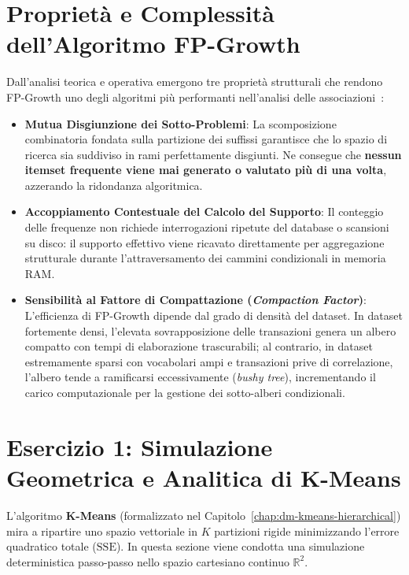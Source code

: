 \FloatBarrier
\section{Proprietà e Complessità dell'Algoritmo FP-Growth}
\label{sec:dm-fp-properties-complexity}

Dall'analisi teorica e operativa emergono tre proprietà strutturali che rendono FP-Growth uno degli algoritmi più performanti nell'analisi delle associazioni~\cite{han2000}:
\begin{itemize}
    \item \textbf{Mutua Disgiunzione dei Sotto-Problemi}: La scomposizione combinatoria fondata sulla partizione dei suffissi garantisce che lo spazio di ricerca sia suddiviso in rami perfettamente disgiunti. Ne consegue che \textbf{nessun itemset frequente viene mai generato o valutato più di una volta}, azzerando la ridondanza algoritmica.
    \item \textbf{Accoppiamento Contestuale del Calcolo del Supporto}: Il conteggio delle frequenze non richiede interrogazioni ripetute del database o scansioni su disco: il supporto effettivo viene ricavato direttamente per aggregazione strutturale durante l'attraversamento dei cammini condizionali in memoria RAM.
    \item \textbf{Sensibilità al Fattore di Compattazione (\textit{Compaction Factor})}: L'efficienza di FP-Growth dipende dal grado di densità del dataset. In dataset fortemente densi, l'elevata sovrapposizione delle transazioni genera un albero compatto con tempi di elaborazione trascurabili; al contrario, in dataset estremamente sparsi con vocabolari ampi e transazioni prive di correlazione, l'albero tende a ramificarsi eccessivamente (\textit{bushy tree}), incrementando il carico computazionale per la gestione dei sotto-alberi condizionali.
\end{itemize}


\FloatBarrier
\section{Esercizio 1: Simulazione Geometrica e Analitica di K-Means}
\label{sec:dm-kmeans-exercise-1}

L'algoritmo \textbf{K-Means} (formalizzato nel Capitolo~\ref{chap:dm-kmeans-hierarchical}) mira a ripartire uno spazio vettoriale in $K$ partizioni rigide minimizzando l'errore quadratico totale ($\mathrm{SSE}$). In questa sezione viene condotta una simulazione deterministica passo-passo nello spazio cartesiano continuo $\mathbb{R}^2$.

